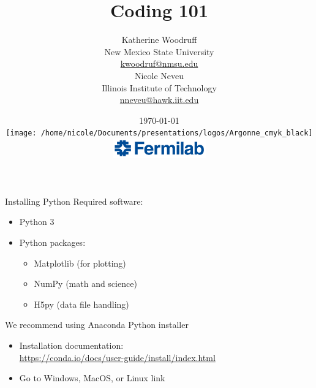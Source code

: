 \documentclass[xcolor=dvipsnames, professionalfonts,t]{beamer}
\title[September 2018]{\vspace{-1em}Coding 101 }
\author[K. Woodruff, N.Neveu]{{\Large{Katherine Woodruff} \\ \small{New Mexico State University} \\
		\url{kwoodruf@nmsu.edu} \\ \vspace{1em} \Large{Nicole Neveu} \\ \small{Illinois Institute of Technology}   \\ \url{nneveu@hawk.iit.edu}    }} \vspace{-5em}
\institute[] %
{   
	  
}
\date{ \today \\
	\texttt{[image: /home/nicole/Documents/presentations/logos/Argonne\_cmyk\_black]}%
	\hfill \hfill \hfill%
	\includegraphics[width=4cm,keepaspectratio]{FNAL}%
}
\begin{document}

\begin{frame}
\titlepage
\end{frame}
\begin{frame}{Installing Python}
  Required software:
  \begin{itemize}
    \item Python 3
    \item Python packages:
    \begin{itemize}
      \item Matplotlib (for plotting)
      \item NumPy (math and science)
      \item H5py (data file handling)
    \end{itemize}
  \end{itemize}
  We recommend using Anaconda Python installer
  \begin{itemize}
    \item Installation documentation: \\
    \url{https://conda.io/docs/user-guide/install/index.html}
    \item Go to Windows, MacOS, or Linux link
  \end{itemize}
\end{frame}
\end{document}
